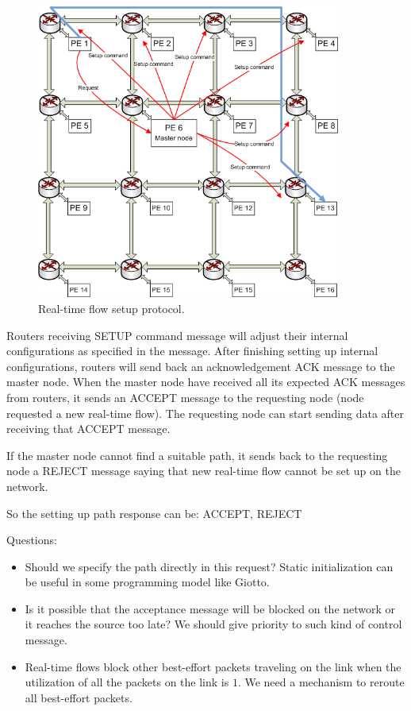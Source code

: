 \documentclass[10pt]{article}
\begin{document}
\begin{figure}[htp]\label{fig:ReqSetup}
\centering
\includegraphics[width=10cm]{pics/Protocol2}
\caption[Setup request for a real-time flow.]
{Real-time flow setup protocol.}
\end{figure}

Routers receiving SETUP command message will adjust their internal
configurations as specified in the message. After finishing setting up internal
configurations, routers will send back an acknowledgement ACK message to
the master node. When the master node have received all its expected ACK
messages from routers, it sends an ACCEPT message to the requesting node
(node requested a new real-time flow). The requesting node can start sending
data after receiving that ACCEPT message.

If the master node cannot find a suitable path, it sends back to the requesting
node a REJECT message saying that new real-time flow cannot be set up on the
network.

So the setting up path response can be: ACCEPT, REJECT

Questions:
\begin{itemize}
\item Should we specify the path directly in this request? Static initialization 
can be useful in some programming model like Giotto.	
\item Is it possible that the acceptance message will be blocked on the network 
or it reaches the source too late? We should give priority to such kind of control
message.
\item Real-time flows block other best-effort packets traveling on the link when 
the utilization of all the packets on the link is $1$. We need a mechanism to
reroute all best-effort packets.
\end{itemize}
\end{document}
